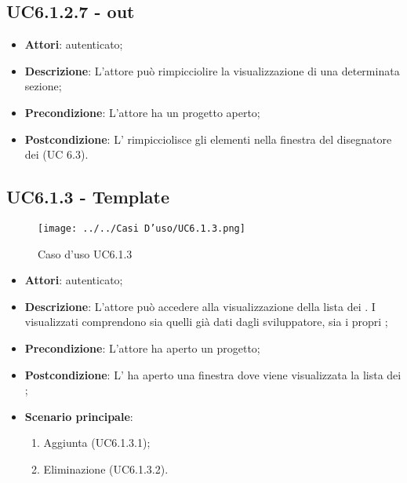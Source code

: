 \subsection{UC6.1.2.7 -  out}
\label{ssec:UC6.1.2.7}
\begin{itemize}
\item \textbf{Attori}:  autenticato;
\item \textbf{Descrizione}: L’attore può rimpicciolire la visualizzazione di una determinata sezione;
\item \textbf{Precondizione}: L’attore ha un progetto aperto;
\item \textbf{Postcondizione}: L’ rimpicciolisce gli elementi nella finestra del disegnatore dei  (UC 6.3).
\end{itemize}
\newpage
\subsection{UC6.1.3 - Template}
\label{ssec:UC6.1.3}
\begin{figure}[h!]
\centering
\texttt{[image: ../../Casi D'uso/UC6.1.3.png]}
\caption{Caso d'uso UC6.1.3}
 \end{figure}
\begin{itemize}
\item \textbf{Attori}:  autenticato;
\item \textbf{Descrizione}: L’attore può accedere alla visualizzazione della lista dei . I  visualizzati comprendono sia quelli già dati dagli sviluppatore, sia i propri ;
\item \textbf{Precondizione}: L’attore ha aperto un progetto;
\item \textbf{Postcondizione}: L' ha aperto una finestra dove viene visualizzata la lista dei ;
\item \textbf{Scenario principale}: \begin{enumerate}\item Aggiunta  (UC6.1.3.1);\item Eliminazione  (UC6.1.3.2).
 \end{enumerate}
\end{itemize}
